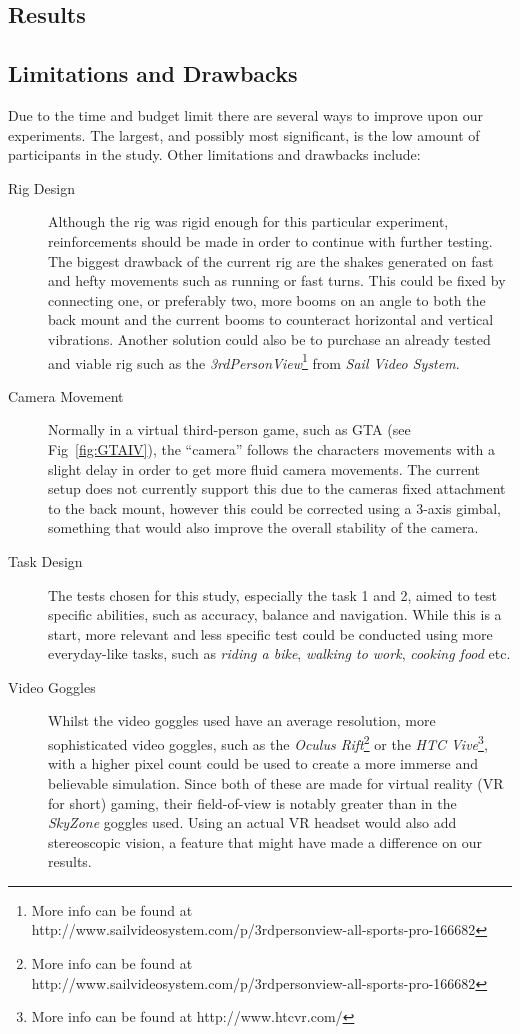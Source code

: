 \documentclass[runningheads,a4paper,oribibl]{llncs}
\begin{document}
\subsection{Results}



\subsection{Limitations and Drawbacks}
Due to the time and budget limit there are several ways to improve upon our experiments. The largest, and possibly most significant, is the low amount of participants in the study. Other limitations and drawbacks include:
\begin{description}
	\item[Rig Design] Although the rig was rigid enough for this particular experiment, reinforcements should be made in order to continue with further testing. The biggest drawback of the current rig are the shakes generated on fast and hefty movements such as running or fast turns. This could be fixed by connecting one, or preferably two, more booms on an angle to both the back mount and the current booms to counteract horizontal and vertical vibrations. Another solution could also be to purchase an already tested and viable rig such as the \emph{3rdPersonView}\footnote{More info can be found at http://www.sailvideosystem.com/p/3rdpersonview-all-sports-pro-166682} from \emph{Sail Video System}.

	\item[Camera Movement] Normally in a virtual third-person game, such as GTA (see Fig~\ref{fig:GTAIV}), the ``camera'' follows the characters movements with a slight delay in order to get more fluid camera movements. The current setup does not currently support this due to the cameras fixed attachment to the back mount, however this could be corrected using a 3-axis gimbal, something that would also improve the overall stability of the camera.

	\item[Task Design] The tests chosen for this study, especially the task 1 and 2, aimed to test specific abilities, such as accuracy, balance and navigation. While this is a start, more relevant and less specific test could be conducted using more everyday-like tasks, such as \emph{riding a bike}, \emph{walking to work}, \emph{cooking food} etc.

	\item[Video Goggles] Whilst the video goggles used have an average resolution, more sophisticated video goggles, such as the \emph{Oculus Rift}\footnote{More info can be found at http://www.sailvideosystem.com/p/3rdpersonview-all-sports-pro-166682} or the \emph{HTC Vive}\footnote{More info can be found at http://www.htcvr.com/}, with a higher pixel count could be used to create a more immerse and believable simulation. Since both of these are made for virtual reality (VR for short) gaming, their field-of-view is notably greater than in the \emph{SkyZone} goggles used. Using an actual VR headset would also add stereoscopic vision, a feature that might have made a difference on our results.


\end{description}
\end{document}
